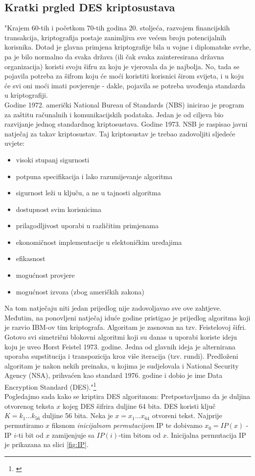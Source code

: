 \documentclass[a4paper,oneside,12pt]{memoir} %
\begin{document}
\begin{spacing}{1.5}
\subsection{Kratki prgled DES kriptosustava}
"Krajem 60-tih i početkom 70-tih godina 20. stoljeća, razvojem financijskih transakcija, kriptografija postaje zanimljiva sve većem broju potencijalnih korisnika. Dotad je glavna primjena kriptografije bila u vojne i diplomatske svrhe, pa je bilo normalno da svaka država (ili čak svaka zainteresirana državna organizacija) koristi svoju šifru za koju je vjerovala da je najbolja. No, tada se pojavila potreba za šifrom koju će moći koristiti korisnici širom svijeta, i u koju će svi oni moći imati povjerenje - dakle, pojavila se potreba uvođenja standarda u kriptografiji.\\
Godine 1972. američki National Bureau of Standards (NBS) inicirao je program za zaštitu računalnih i komunikacijskih podataka. Jedan je od ciljeva bio razvijanje jednog standardnog kriptosustava. Godine 1973. NSB je raspisao javni natječaj za takav kriptosustav. Taj kriptosustav je trebao zadovoljiti sljedeće uvjete:
\begin{itemize}
\item visoki stupanj sigurnosti
\item potpuna specifikacija i lako razumijevanje algoritma
\item sigurnost leži u ključu, a ne u tajnosti algoritma
\item dostupnost svim korisnicima
\item prilagodljivost uporabi u različitim primjenama
\item ekonomičnost implementacije u elektoničkim uređajima
\item efikasnost
\item mogućnost provjere
\item mogućnost izvoza (zbog američkih zakona)
\end{itemize}

Na tom natječaju niti jedan prijedlog nije zadovoljavao sve ove zahtjeve. Međutim, na ponovljeni natječaj iduće godine pristigao je prijedlog algoritma koji je razvio IBM-ov tim kriptografa. Algoritam je zasnovan na tzv. Feistelovoj šifri. Gotovo svi simetrični blokovni algoritmi koji su danas u uporabi koriste ideju koju je uveo Horst Feistel 1973. godine. Jedna od glavnih ideja je alternirana uporaba supstitucija i transpozicija kroz više iteracija (tzv. rundi).
Predloženi algoritam je nakon nekih preinaka, u kojima je sudjelovala i National Security Agency (NSA), prihvaćen kao standard 1976. godine i dobio je ime Data Encryption Standard (DES)."\footnote{\cite[s. ~?]{duje}}\\
Pogledajmo sada kako se kriptira DES algoritmom:
Pretpostavljamo da je duljina otvorenog teksta $x$ kojeg DES šifrira duljine 64 bita. DES koristi ključ $K=k_1...k_{56}$ duljine 56 bita.
Neka je $x=x_1...x_{64}$ otvoreni tekst. Najprije permutiramo $x$ fiksnom \textit{inicijalnom permutacijom} IP te dobivamo $x_0=IP(x)$ - IP $i$-ti bit od $x$ zamijenjuje sa $IP(i)$-tim bitom od $x$. Inicijalna permutacija IP je prikazana na slici \ref{fig:IP}.


\end{spacing}
\end{document}
